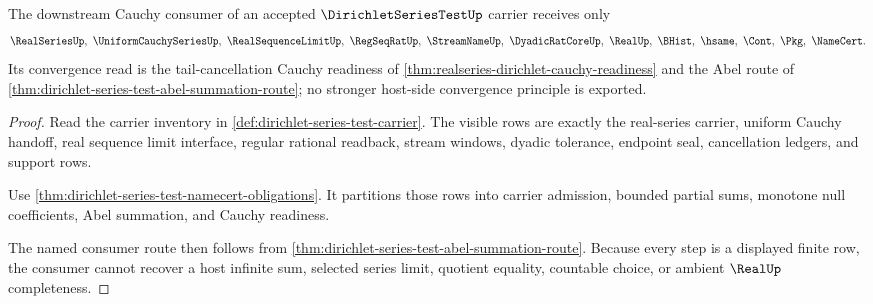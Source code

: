 \begin{theorem}
\label{thm:dirichlet-series-test-cauchy-consumer-surface}
The downstream Cauchy consumer of an accepted $\DirichletSeriesTestUp$ carrier receives only
$$
\RealSeriesUp,\ \UniformCauchySeriesUp,\ \RealSequenceLimitUp,\ \RegSeqRatUp,\ \StreamNameUp,\ \DyadicRatCoreUp,\ \RealUp,\ \BHist,\ \hsame,\ \Cont,\ \Pkg,\ \NameCert .
$$
Its convergence read is the tail-cancellation Cauchy readiness of \autoref{thm:realseries-dirichlet-cauchy-readiness} and the Abel route of \autoref{thm:dirichlet-series-test-abel-summation-route}; no stronger host-side convergence principle is exported.
\end{theorem}
\begin{proof}
Read the carrier inventory in \autoref{def:dirichlet-series-test-carrier}. The visible rows are exactly the real-series carrier, uniform Cauchy handoff, real sequence limit interface, regular rational readback, stream windows, dyadic tolerance, endpoint seal, cancellation ledgers, and support rows.

Use \autoref{thm:dirichlet-series-test-namecert-obligations}. It partitions those rows into carrier admission, bounded partial sums, monotone null coefficients, Abel summation, and Cauchy readiness.

The named consumer route then follows from \autoref{thm:dirichlet-series-test-abel-summation-route}. Because every step is a displayed finite row, the consumer cannot recover a host infinite sum, selected series limit, quotient equality, countable choice, or ambient $\RealUp$ completeness.
\end{proof}




